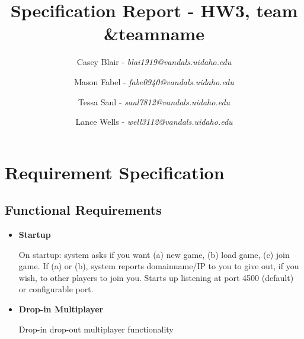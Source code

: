 \documentclass[12pt]{report}
\title{Specification Report - HW3, team \&teamname}
\author{
Casey Blair - \textit{blai1919@vandals.uidaho.edu} \\
\and Mason Fabel - \textit{fabe0940@vandals.uidaho.edu} \\
\and Tessa Saul - \textit{saul7812@vandals.uidaho.edu} \\
\and Lance Wells - \textit{well3112@vandals.uidaho.edu} \\
}
\begin{document}
\maketitle

\chapter{Requirement Specification}
\section{Functional Requirements}
\begin{itemize}
	\item \textbf{Startup}
	
	On startup: system asks if you want (a) new game, (b) load game, (c)
	join game. If (a) or (b), system reports domainname/IP to you to give
	out, if you wish, to other players to join you. Starts up listening at
	port 4500 (default) or configurable port.
	
	\item \textbf{Drop-in Multiplayer}
	
	 Drop-in drop-out multiplayer functionality
\end{itemize}
\end{document}
